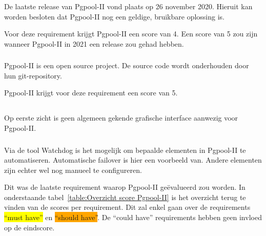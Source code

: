 \subsubsection{}
\label{subsubsec:Actieve ondersteuning in 2020-2021}

De laatste release van Pgpool-II vond plaats op 26 november 2020. Hieruit kan worden besloten dat Pgpool-II nog een geldige, bruikbare oplossing is.

Voor deze requirement krijgt Pgpool-II een score van 4. Een score van 5 zou zijn wanneer Pgpool-II in 2021 een release zou gehad hebben.

\subsubsection{}
\label{subsubsec:Open source}

Pgpool-II is een open source project. De source code wordt onderhouden door hun git-repository.

Pgpool-II krijgt voor deze requirement een score van 5.

\subsection{}
\label{subsec:Could have}


\subsubsection{}
\label{subsubsec:Grafische interface}

Op eerste zicht is geen algemeen gekende grafische interface aanwezig voor Pgpool-II.

\subsubsection{}
\label{subsubsec:Beperkte manuele interventie}

Via de tool Watchdog is het mogelijk om bepaalde elementen in Pgpool-II te automatiseren. Automatische failover is hier een voorbeeld van. Andere elementen zijn echter wel nog manueel te configureren.


Dit was de laatste requirement waarop Pgpool-II geëvalueerd zou worden. In onderstaande tabel~\ref{table:Overzicht score Pgpool-II} is het overzicht terug te vinden van de scores per requirement. Dit zal enkel gaan over de requirements \colorbox{yellow}{“must have”} en \colorbox{orange}{“should have”}. De “could have” requirements hebben geen invloed op de eindscore.

